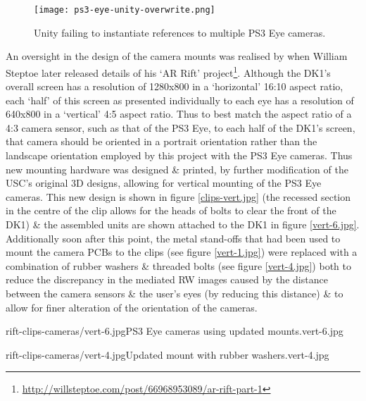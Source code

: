 \begin{figure}[h]
	\begin{center}
		\texttt{[image: ps3-eye-unity-overwrite.png]}
		\caption{Unity failing to instantiate references to multiple PS3 Eye cameras.}
		\label{ps3-eye-unity-overwrite.png}
	\end{center}
\end{figure}

An oversight in the design of the camera mounts was realised by when William Steptoe later released details of his `AR Rift' project\footnote{\url{http://willsteptoe.com/post/66968953089/ar-rift-part-1}}. Although the DK1's overall screen has a resolution of 1280x800 in a `horizontal' 16:10 aspect ratio, each `half' of this screen as presented individually to each eye has a resolution of 640x800 in a `vertical' 4:5 aspect ratio. Thus to best match the aspect ratio of a 4:3 camera sensor, such as that of the PS3 Eye, to each half of the DK1's screen, that camera should be oriented in a portrait orientation rather than the landscape orientation employed by this project with the PS3 Eye cameras. Thus new mounting hardware was designed \& printed, by further modification of the USC's original 3D designs, allowing for vertical mounting of the PS3 Eye cameras. This new design is shown in figure \ref{clips-vert.jpg} (the recessed section in the centre of the clip allows for the heads of bolts to clear the front of the DK1) \& the assembled units are shown attached to the DK1 in figure \ref{vert-6.jpg}. Additionally soon after this point, the metal stand-offs that had been used to mount the camera PCBs to the clips (see figure \ref{vert-1.jpg}) were replaced with a combination of rubber washers \& threaded bolts (see figure \ref{vert-4.jpg}) both to reduce the discrepancy in the mediated RW images caused by the distance between the camera sensors \& the user's eyes (by reducing this distance) \& to allow for finer alteration of the orientation of the cameras.

       {rift-clips-cameras/vert-6.jpg}{PS3 Eye cameras using updated mounts.}{vert-6.jpg}

       {rift-clips-cameras/vert-4.jpg}{Updated mount with rubber washers.}{vert-4.jpg}

